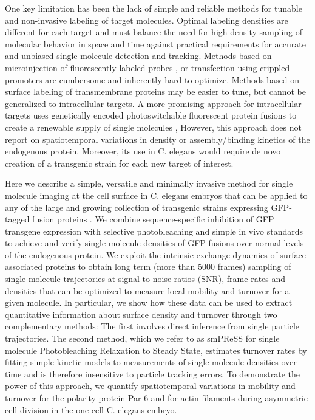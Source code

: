  
 One key limitation has been the lack of simple and reliable methods for tunable and non-invasive labeling of target molecules. Optimal labeling densities are different for each target and must balance the need for high-density sampling of molecular behavior in space and time against practical requirements for accurate and unbiased single molecule detection and tracking. Methods based on microinjection of fluorescently labeled probes \cite{nmeth4,nmeth5}, or transfection using crippled promoters \cite{nmeth6,nmeth7,nmeth8,nmeth9} are cumbersome and inherently hard to optimize. Methods based on surface labeling of transmembrane proteins \cite{nmeth10,nmeth11,nmeth12,nmeth13} may be easier to tune, but cannot be generalized to intracellular targets. A more promising approach for intracellular targets uses genetically encoded photoswitchable fluorescent protein fusions to create a renewable supply of single molecules \cite{nmeth14,nmeth15,nmeth16}, However, this approach does not report on spatiotemporal variations in density or assembly/binding kinetics of the endogenous protein. Moreover, its use in C. elegans would require de novo creation of a transgenic strain for each new target of interest.
 
 
 Here we describe a simple, versatile and minimally invasive method for single molecule imaging at the cell surface in C. elegans embryos that can be applied to any of the large and growing collection of transgenic strains expressing GFP-tagged fusion proteins \cite{nmeth17}. We combine sequence-specific inhibition of GFP transgene expression with selective photobleaching and simple in vivo standards to achieve and verify single molecule densities of GFP-fusions over normal levels of the endogenous protein. We exploit the intrinsic exchange dynamics of surface-associated proteins to obtain long term (more than 5000 frames) sampling of single molecule trajectories at signal-to-noise ratios (SNR), frame rates and densities that can be optimized to measure local mobility and turnover for a given molecule. In particular, we show how these data can be used to extract quantitative information about surface density and turnover through two complementary methods: The first involves direct inference from single particle trajectories. The second method, which we refer to as smPReSS for single molecule Photobleaching Relaxation to Steady State, estimates turnover rates by fitting simple kinetic models to measurements of single molecule densities over time and is therefore insensitive to particle tracking errors. To demonstrate the power of this approach, we quantify spatiotemporal variations in mobility and turnover for the polarity protein Par-6 and for actin filaments during asymmetric cell division in the one-cell C. elegans embryo.
 
